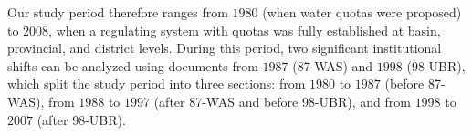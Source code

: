 Our study period therefore ranges from $1980$ (when water quotas were proposed) to $2008$, when a regulating system with quotas was fully established at basin, provincial, and district levels.
During this period, two significant institutional shifts can be analyzed using documents from $1987$ (87-WAS) and $1998$ (98-UBR), which split the study period into three sections: from $1980$ to $1987$ (before 87-WAS), from $1988$ to $1997$ (after 87-WAS and before 98-UBR), and from $1998$ to $2007$ (after 98-UBR).
